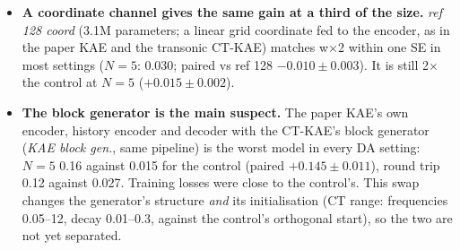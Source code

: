 \documentclass[10pt]{article}
\begin{document}
\begin{itemize}
  in most DA settings and lowers ref 128's error for $\delta_l \le 10$, at moderate noise and at partial coverage, though not at $\delta_l = 40$ or noise $\ge 0.2$ ($N = 5$: 0.030 vs 0.040, paired
  $-0.009 \pm 0.002$; $\delta_l = 10$: 0.22 vs 0.30). It is still 2$\times$ the control at $N = 5$
  (paired $+0.015 \pm 0.002$) and 10$\times$ at $\delta_l = 10$; it ties back001 128. It has the
  best CT-KAE forecast to $0.5\,T_L$ (0.30 at $0.25\,T_L$, control 0.43).
\item \textbf{A coordinate channel gives the same gain at a third of the size.} \emph{ref 128
  coord} (3.1M parameters; a linear grid coordinate fed to the encoder, as in the paper KAE and the
  transonic CT-KAE) matches w$\times$2 within one SE in most settings ($N = 5$: 0.030; paired vs
  ref 128 $-0.010 \pm 0.003$). It is still 2$\times$ the control at $N = 5$ ($+0.015 \pm 0.002$).
\item \textbf{The block generator is the main suspect.} The paper KAE's own encoder, history
  encoder and decoder with the CT-KAE's block generator (\emph{KAE block gen.}, same pipeline)
  is the worst model in every DA setting: $N = 5$ 0.16 against 0.015 for the control (paired
  $+0.145 \pm 0.011$), round trip 0.12 against 0.027. Training losses were close to the control's.
  This swap changes the generator's structure \emph{and} its initialisation (CT range: frequencies
  0.05--12, decay 0.01--0.3, against the control's orthogonal start), so the two are not yet
  separated.
\end{itemize}
\end{document}
